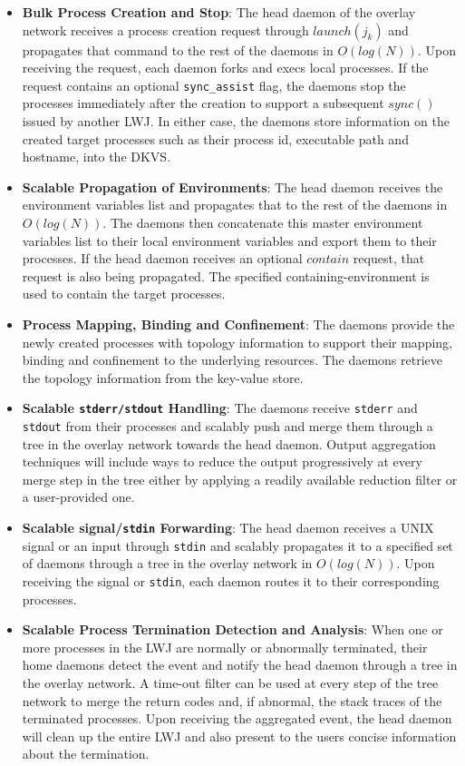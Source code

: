 \begin{itemize}
\item{{\bf Bulk Process Creation and Stop}: The head daemon of the overlay network
receives a process creation request
through $launch(j_k)$ and propagates that command to the rest of the daemons
in $O(log(N))$. Upon receiving the request, each daemon forks and execs
local processes. If the request contains an optional {\tt sync\_assist} flag, the daemons
stop the processes immediately after the creation to support a subsequent $sync()$ issued
by another LWJ. In either case, the daemons store
information on the created target processes such as their process id, executable path
and hostname, into the DKVS.}

\item{{\bf Scalable Propagation of Environments}: The head daemon receives the environment
variables list and propagates that to the rest of the daemons
in $O(log(N))$. The daemons then concatenate this master environment variables
list to their local environment variables and export them to their
processes. If the head daemon receives an optional $contain$ request, that
request is also being propagated. The specified containing-environment is used to contain
the target processes.}

\item{{\bf Process Mapping, Binding and Confinement}: The daemons provide the newly created processes
with topology information to support their mapping, binding and confinement to the underlying 
resources. The daemons retrieve the topology information from the key-value store.}

\item{{\bf Scalable {\tt stderr/stdout} Handling}: The daemons receive
{\tt stderr} and {\tt stdout}
from their processes and scalably push and merge them through a tree in the overlay
network towards the head daemon. Output aggregation techniques
will include ways to reduce the output progressively at every merge step
in the tree either by applying a readily available
reduction filter or a user-provided one.}

\item{{\bf Scalable signal/{\tt stdin} Forwarding}: The head daemon receives a UNIX signal
or an input through {\tt stdin} and scalably propagates it to a specified set of daemons
through a tree in the overlay network in $O(log(N))$. Upon receiving the signal or {\tt stdin},
each daemon routes it to their corresponding processes.}

\item{{\bf Scalable Process Termination Detection and Analysis}: When one or more processes
in the LWJ are normally or abnormally terminated, their home daemons detect the event and notify
the head daemon through a tree in the overlay network. A time-out filter can be used at every step of
the tree network to merge the return codes and, if abnormal, the stack traces of 
the terminated processes. Upon receiving the aggregated
event, the head daemon will clean up the entire LWJ and also present
to the users concise information about the termination.}

\end{itemize}


